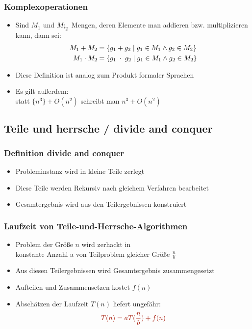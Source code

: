 \documentclass{article}
\newcommand{\important}[1]{\textcolor{importantColor}{#1}}
\newcommand{\set}[1]{\{#1\}}
\newcommand{\anfuehrung}[1]{\flqq #1\frqq}
\begin{document}
\subsubsection{Komplexoperationen}
\begin{itemize}
    \item Sind $M_1$ und $M;_2$ Mengen, deren Elemente man addieren bzw. multiplizieren kann, dann sei:
    \begin{align*}
        M_1+M_2 &= \set{g_1+g_2 \mid g_1 \in M_1 \land g_2 \in M_2}\\
        M_1\cdot M_2 
        &= \set{g_1 \hphantom{\cdot} \cdot \hphantom{\cdot} g_2 \mid g_1\in M_1 \land g_2\in M_2}
    \end{align*}
    \item Diese Definition ist analog zum Produkt formaler Sprachen
    \item Es gilt außerdem: \\
    statt $\set{n^3}+O(n^2)$ schreibt man $n^3+O(n^2)$
\end{itemize}

\subsection{Teile und herrsche / divide and conquer}
\subsubsection{Definition divide and conquer}
\begin{itemize}
    \item Probleminstanz wird in kleine Teile zerlegt
    \item Diese Teile werden Rekursiv nach gleichem Verfahren bearbeitet
    \item Gesamtergebnis wird aus den Teilergebnissen konstruiert
\end{itemize}

\subsubsection{Laufzeit von Teile-und-Herrsche-Algorithmen}
\begin{itemize}
    \item Problem der Größe $n$ wird zerhackt in \\konstante Anzahl a von Teilproblem gleicher Größe $\frac{n}{b}$
    \item Aus diesen Teilergebnissen wird Gesamtergebnis zusammengesetzt
    \item Aufteilen und Zusammensetzen \anfuehrung{kostet} $f(n)$
    \item Abschätzen der Laufzeit $T(n)$ liefert ungefähr:
    \[\important{T(n)=aT(\frac{n}{b})+f(n)}\]
\end{itemize}
\end{document}
